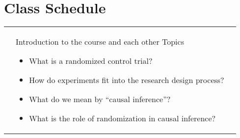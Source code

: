 \documentclass[letterpaper]{inzane_syllabus} %
\begin{document}
\newpage %


\makeFullPage

{} \section{Class Schedule}
\SetDate[07/06/2021]

\begin{center}
    \begin{longtable}{>{\raggedright}p{2.5cm}  @{\hskip 0.5cm} >{\raggedright}p{6cm}>{\raggedright\arraybackslash}p{11cm}}        \arrayrulecolor{myCOLOR}\toprule

        \syldate{\today}  & Introduction to the course and each other 
         Topics
        \begin{itemize}
            \item What is a randomized control trial?
            \item How do experiments fit into the research design process?
            \item What do we mean by ``causal inference''?
            \item What is the role of randomization in causal inference?
        \end{itemize}



\end{longtable}
\end{center}
\end{document}
